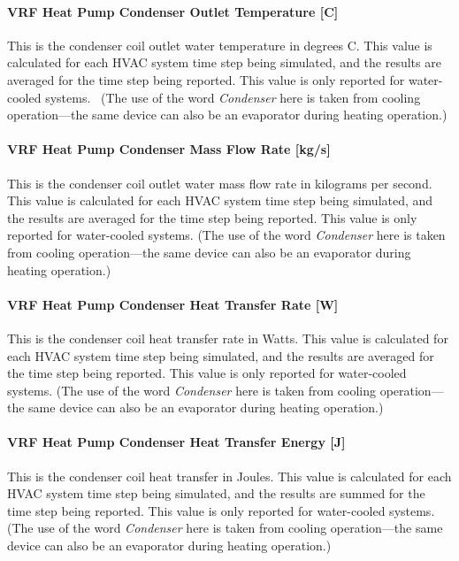 \paragraph{VRF Heat Pump Condenser Outlet Temperature {[}C{]}}\label{vrf-heat-pump-condenser-outlet-temperature-c}

This is the condenser coil outlet water temperature in degrees C. This value is calculated for each HVAC system time step being simulated, and the results are averaged for the time step being reported. This value is only reported for water-cooled systems.~ (The use of the word \emph{Condenser} here is taken from cooling operation---the same device can also be an evaporator during heating operation.)

\paragraph{VRF Heat Pump Condenser Mass Flow Rate {[}kg/s{]}}\label{vrf-heat-pump-condenser-mass-flow-rate-kgs}

This is the condenser coil outlet water mass flow rate in kilograms per second. This value is calculated for each HVAC system time step being simulated, and the results are averaged for the time step being reported. This value is only reported for water-cooled systems. (The use of the word \emph{Condenser} here is taken from cooling operation---the same device can also be an evaporator during heating operation.)

\paragraph{VRF Heat Pump Condenser Heat Transfer Rate {[}W{]}}\label{vrf-heat-pump-condenser-heat-transfer-rate-w}

This is the condenser coil heat transfer rate in Watts. This value is calculated for each HVAC system time step being simulated, and the results are averaged for the time step being reported. This value is only reported for water-cooled systems. (The use of the word \emph{Condenser} here is taken from cooling operation---the same device can also be an evaporator during heating operation.)

\paragraph{VRF Heat Pump Condenser Heat Transfer Energy {[}J{]}}\label{vrf-heat-pump-condenser-heat-transfer-energy-j}

This is the condenser coil heat transfer in Joules. This value is calculated for each HVAC system time step being simulated, and the results are summed for the time step being reported. This value is only reported for water-cooled systems. (The use of the word \emph{Condenser} here is taken from cooling operation---the same device can also be an evaporator during heating operation.)

